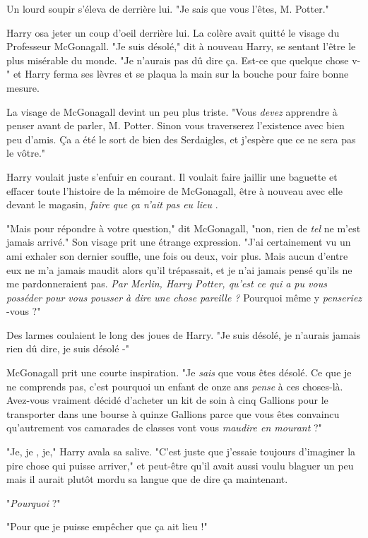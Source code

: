 Un lourd soupir s'éleva de derrière lui. "Je sais que vous l'êtes, M. Potter."

Harry osa jeter un coup d'oeil derrière lui. La colère avait quitté le visage du Professeur McGonagall. "Je suis désolé," dit à nouveau Harry, se sentant l'être le plus misérable du monde. "Je n'aurais pas dû dire ça. Est-ce que quelque chose v-" et Harry ferma ses lèvres et se plaqua la main sur la bouche pour faire bonne mesure.

La visage de McGonagall devint un peu plus triste. "Vous \emph{devez}  apprendre à penser avant de parler, M. Potter. Sinon vous traverserez l'existence avec bien peu d'amis. Ça a été le sort de bien des Serdaigles, et j'espère que ce ne sera pas le vôtre."

Harry voulait juste s'enfuir en courant. Il voulait faire jaillir une baguette et effacer toute l'histoire de la mémoire de McGonagall, être à nouveau avec elle devant le magasin, \emph{faire que ça n'ait pas eu lieu} .

"Mais pour répondre à votre question," dit McGonagall, "non, rien de \emph{tel}  ne m'est jamais arrivé." Son visage prit une étrange expression. "J'ai certainement vu un ami exhaler son dernier souffle, une fois ou deux, voir plus. Mais aucun d'entre eux ne m'a jamais maudit alors qu'il trépassait, et je n'ai jamais pensé qu'ils ne me pardonneraient pas. \emph{Par Merlin, Harry Potter, qu'est ce qui a pu vous posséder pour vous pousser à dire une chose pareille ? } Pourquoi même y \emph{penseriez} -vous ?"

Des larmes coulaient le long des joues de Harry. "Je suis désolé, je n'aurais jamais rien dû dire, je suis désolé -"

McGonagall prit une courte inspiration. "Je \emph{sais}  que vous êtes désolé. Ce que je ne comprends pas, c'est pourquoi un enfant de onze ans \emph{pense}  à ces choses-là. Avez-vous vraiment décidé d'acheter un kit de soin à cinq Gallions pour le transporter dans une bourse à quinze Gallions parce que vous êtes convaincu qu'autrement vos camarades de classes vont vous \emph{maudire en mourant}  ?"

"Je, je , je," Harry avala sa salive. "C'est juste que j'essaie toujours d'imaginer la pire chose qui puisse arriver," et peut-être qu'il avait aussi voulu blaguer un peu mais il aurait plutôt mordu sa langue que de dire ça maintenant.

"\emph{Pourquoi}  ?"

"Pour que je puisse empêcher que ça ait lieu !"

